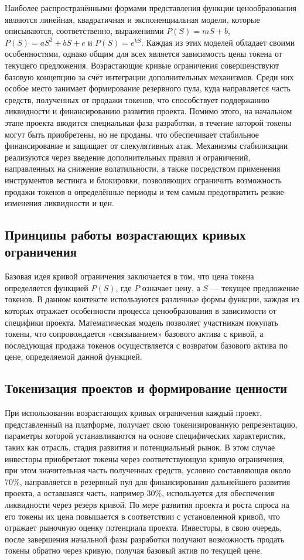 \documentclass[
    candidate, %
    subf, %
    dotsinheaders=false,
]{disser}
\begin{document}
  Наиболее распространёнными формами представления функции ценообразования являются линейная, квадратичная и экспоненциальная модели, которые описываются, соответственно, выражениями $P(S) = mS + b$, $P(S) = aS^2 + bS + c$ и $P(S) = e^{kS}$. Каждая из этих моделей обладает своими особенностями, однако общим для всех является зависимость цены токена от текущего предложения. Возрастающие кривые ограничения совершенствуют базовую концепцию за счёт интеграции дополнительных механизмов. Среди них особое место занимает формирование резервного пула, куда направляется часть средств, полученных от продажи токенов, что способствует поддержанию ликвидности и финансированию развития проекта. Помимо этого, на начальном этапе проекта вводится специальная фаза разработки, в течение которой токены могут быть приобретены, но не проданы, что обеспечивает стабильное финансирование и защищает от спекулятивных атак. Механизмы стабилизации реализуются через введение дополнительных правил и ограничений, направленных на снижение волатильности, а также посредством применения инструментов вестинга и блокировки, позволяющих ограничить возможность продажи токенов в определённые периоды и тем самым предотвратить резкие изменения ликвидности и цен.

  \subsection{Принципы работы возрастающих кривых ограничения}

  Базовая идея кривой ограничения заключается в том, что цена токена определяется функцией $P(S)$, где $P$ означает цену, а $S$ --- текущее предложение токенов. В данном контексте используются различные формы функции, каждая из которых отражает особенности процесса ценообразования в зависимости от специфики проекта. Математическая модель позволяет участникам покупать токены, что сопровождается «связыванием» базового актива с кривой, а последующая продажа токенов осуществляется с возвратом базового актива по цене, определяемой данной функцией.

  \subsection{Токенизация проектов и формирование ценности}

  При использовании возрастающих кривых ограничения каждый проект, представленный на платформе, получает свою токенизированную репрезентацию, параметры которой устанавливаются на основе специфических характеристик, таких как отрасль, стадия развития и потенциальный рынок. В этом случае инвесторы приобретают токены через соответствующую кривую ограничения, при этом значительная часть полученных средств, условно составляющая около 70\%, направляется в резервный пул для финансирования дальнейшего развития проекта, а оставшаяся часть, например 30\%, используется для обеспечения ликвидности через резерв кривой. По мере развития проекта и роста спроса на его токены их цена повышается в соответствии с установленной кривой, что отражает рыночную оценку потенциала проекта. Инвесторы, в свою очередь, после завершения начальной фазы разработки получают возможность продать токены обратно через кривую, получая базовый актив по текущей цене.
\end{document}
